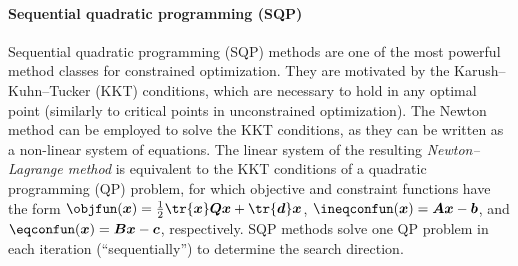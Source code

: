 \paragraph{Sequential quadratic programming (SQP)}

Sequential quadratic programming (SQP) methods
are one of the most powerful method classes for constrained optimization.
They are motivated by the Karush--Kuhn--Tucker (KKT) conditions,
which are necessary to hold in any optimal point
(similarly to critical points in unconstrained optimization).
The Newton method can be employed to solve the KKT conditions,
as they can be written as a non-linear system of equations.
The linear system of the resulting \emph{Newton--Lagrange method}
is equivalent to the KKT conditions of a quadratic programming (QP) problem,
for which objective and constraint functions have the
form $\objfun(\*x) = \frac{1}{2} \tr{\*x} \mat{Q} \*x + \tr{\*d} \*x$,
$\ineqconfun(\*x) = \mat{A} \*x - \*b$, and
$\eqconfun(\*x) = \mat{B} \*x - \*c$, respectively.
SQP methods solve one QP problem in each iteration (``sequentially'')
to determine the search direction.
